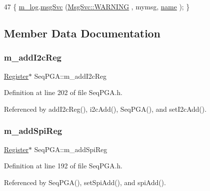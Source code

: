 \begin{DoxyCode}
47 \{ \hyperlink{classObject_a0d269813dd7ac1f24bc143031e2963f2}{m\_log}.\hyperlink{classMsgSvc_ad25f18047920cc59a314e5098259711c}{msgSvc} (\hyperlink{classMsgSvc_ae671eb7301996cd049d2da8a65925926a7cefae88f2ba26b2b05b676a383c834b}{MsgSvc::WARNING} , mymsg, \hyperlink{classObject_a300f4c05dd468c7bb8b3c968868443c1}{name} ); \}
\end{DoxyCode}


\subsection{Member Data Documentation}
\mbox{\label{classSeqPGA_ac3a6aad3fec65ceb78528b6d20deeb3f}} 
\subsubsection{\texorpdfstring{m\+\_\+add\+I2c\+Reg}{m\_addI2cReg}}
{\footnotesize\ttfamily \hyperlink{classRegister}{Register}$\ast$ Seq\+P\+G\+A\+::m\+\_\+add\+I2c\+Reg\hspace{0.3cm}{\ttfamily [private]}}



Definition at line 202 of file Seq\+P\+G\+A.\+h.



Referenced by add\+I2c\+Reg(), i2c\+Add(), Seq\+P\+G\+A(), and set\+I2c\+Add().

\mbox{\label{classSeqPGA_af31d87ad56c501584ccb9c60776a1289}} 
\subsubsection{\texorpdfstring{m\+\_\+add\+Spi\+Reg}{m\_addSpiReg}}
{\footnotesize\ttfamily \hyperlink{classRegister}{Register}$\ast$ Seq\+P\+G\+A\+::m\+\_\+add\+Spi\+Reg\hspace{0.3cm}{\ttfamily [private]}}



Definition at line 192 of file Seq\+P\+G\+A.\+h.



Referenced by Seq\+P\+G\+A(), set\+Spi\+Add(), and spi\+Add().


